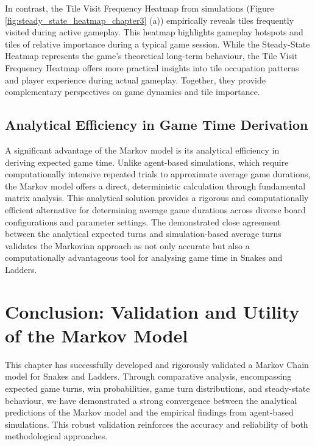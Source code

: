 In contrast, the Tile Visit Frequency Heatmap from simulations (Figure \ref{fig:steady_state_heatmap_chapter3} (a)) empirically reveals tiles frequently visited during active gameplay. This heatmap highlights gameplay hotspots and tiles of relative importance during a typical game session. While the Steady-State Heatmap represents the game's theoretical long-term behaviour, the Tile Visit Frequency Heatmap offers more practical insights into tile occupation patterns and player experience during actual gameplay. Together, they provide complementary perspectives on game dynamics and tile importance.

\subsection{Analytical Efficiency in Game Time Derivation}

A significant advantage of the Markov model is its analytical efficiency in deriving expected game time. Unlike agent-based simulations, which require computationally intensive repeated trials to approximate average game durations, the Markov model offers a direct, deterministic calculation through fundamental matrix analysis. This analytical solution provides a rigorous and computationally efficient alternative for determining average game durations across diverse board configurations and parameter settings. The demonstrated close agreement between the analytical expected turns and simulation-based average turns validates the Markovian approach as not only accurate but also a computationally advantageous tool for analysing game time in Snakes and Ladders.

\section{Conclusion: Validation and Utility of the Markov Model}

This chapter has successfully developed and rigorously validated a Markov Chain model for Snakes and Ladders. Through comparative analysis, encompassing expected game turns, win probabilities, game turn distributions, and steady-state behaviour, we have demonstrated a strong convergence between the analytical predictions of the Markov model and the empirical findings from agent-based simulations. This robust validation reinforces the accuracy and reliability of both methodological approaches.

